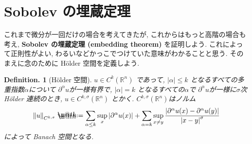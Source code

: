 \documentclass[openany, a4paper, oneside]{book}
\makeatletter
\newcommand*{\defeq}{\mathrel{\rlap{%
\raisebox{0.3ex}{$\m@th\cdot$}}%
\raisebox{-0.3ex}{$\m@th\cdot$}}%
=}
\theoremstyle{break}
\theoremstyle{breakdefn}
\newtheorem{defn}[thm]{Definition.}
\newcommand{\abs}[1]{\left|#1\right|}
\newcommand{\norm}[1]{\left\Vert#1\right\Vert}
\newcommand{\bbR}{\mathbb{R}}
\makeatother
\begin{document}
\section{Sobolev の埋蔵定理}
\label{sec-7-6-3}

これまで微分が一回だけの場合を考えてきたが, これからはもっと高階の場合も考え,
\textbf{Sobolev の埋蔵定理 (embedding theorem)} を証明しよう.
これによって正則性がよい, わるいなどかっこでつけていた意味がわかることと思う.
そのまえに念のために H\"older 空間を定義しよう.
\begin{defn}[H\"{o}lder 空間]
 $u \in C^k (\bbR^n)$ であって, $\abs{\alpha} \le k$ となるすべての多重指数$\alpha$について
 $\partial^{\alpha} u$が一様有界で, $|\alpha| = k$ となるすべての$\alpha$で
 $\partial^{\alpha} u$が一様に$\sigma$次 H\"older 連続のとき,
 $u \in C^{k, \sigma}(\bbR^n)$ とかく.
 $C^{k, \sigma}(\bbR^n)$はノルム
 \begin{align}
  \norm{u}_{C^{k, \sigma}}
  \defeq
  \sum_{\alpha \le k}\sup_{x} \abs{\partial^{\alpha}u (x)} +
   \sum_{\alpha = k}\sup_{x \neq y}
    \frac{\abs{\partial^{\alpha}u (x) - \partial^{\alpha}u (y)}}{\abs{x - y}^{\sigma}}
 \end{align}
 によって Banach 空間となる.
\end{defn}
\end{document}
